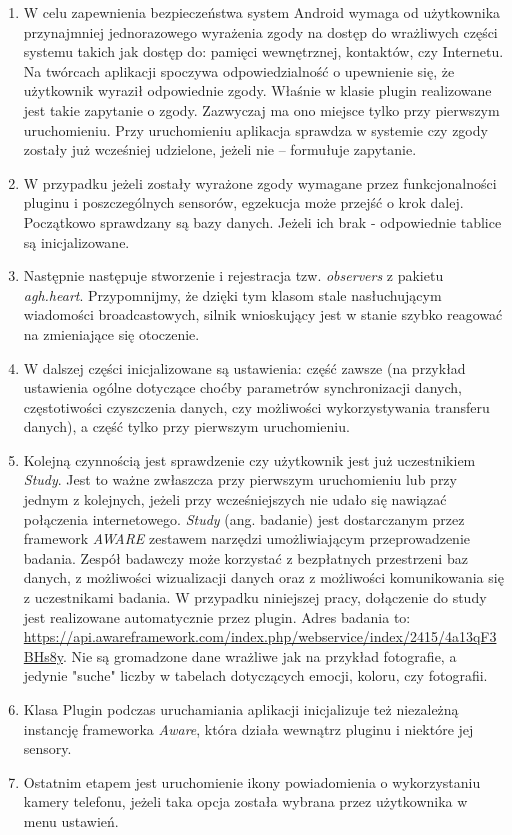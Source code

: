 \begin{enumerate}
	\item W celu zapewnienia bezpieczeństwa system Android wymaga od użytkownika przynajmniej jednorazowego wyrażenia zgody na dostęp do wrażliwych części systemu takich jak dostęp do: pamięci wewnętrznej, kontaktów, czy Internetu. Na twórcach aplikacji spoczywa odpowiedzialność o upewnienie się, że użytkownik wyraził odpowiednie zgody. Właśnie w klasie plugin realizowane jest takie zapytanie o zgody. Zazwyczaj ma ono miejsce tylko przy pierwszym uruchomieniu. Przy uruchomieniu aplikacja sprawdza w systemie czy zgody zostały już wcześniej udzielone, jeżeli nie -- formułuje zapytanie.
	
	\item W przypadku jeżeli zostały wyrażone zgody wymagane przez funkcjonalności pluginu i poszczególnych sensorów, egzekucja może przejść o krok dalej. Początkowo sprawdzany są bazy danych. Jeżeli ich brak - odpowiednie tablice są inicjalizowane. 
	
	\item Następnie następuje stworzenie i rejestracja tzw. \textit{observers} z pakietu \textit{agh.heart}. Przypomnijmy, że dzięki tym klasom stale nasłuchującym wiadomości broadcastowych, silnik wnioskujący jest w stanie szybko reagować na zmieniające się otoczenie. 
	
	\item W dalszej części inicjalizowane są ustawienia: część zawsze (na przykład ustawienia ogólne dotyczące choćby parametrów synchronizacji danych, częstotiwości czyszczenia danych, czy możliwości wykorzystywania transferu danych), a część tylko przy pierwszym uruchomieniu.
	
	\item Kolejną czynnością jest sprawdzenie czy użytkownik jest już uczestnikiem \textit{Study}. Jest to ważne zwłaszcza przy pierwszym uruchomieniu lub przy jednym z kolejnych, jeżeli przy wcześniejszych nie udało się nawiązać połączenia internetowego. \textit{Study} (ang. badanie) jest dostarczanym przez framework \textit{AWARE} zestawem narzędzi umożliwiającym przeprowadzenie badania. Zespół badawczy może korzystać z bezpłatnych przestrzeni baz danych, z możliwości wizualizacji danych oraz z możliwości komunikowania się z uczestnikami badania. W przypadku niniejszej pracy, dołączenie do study jest realizowane automatycznie przez plugin. Adres badania to: \url{https://api.awareframework.com/index.php/webservice/index/2415/4a13qF3BHs8y}. Nie są gromadzone dane wrażliwe jak na przykład fotografie, a jedynie "suche" liczby w tabelach dotyczących emocji, koloru, czy fotografii.
	
	\item Klasa Plugin podczas uruchamiania aplikacji inicjalizuje też niezależną instancję frameworka \textit{Aware}, która działa wewnątrz pluginu i niektóre jej sensory.
	
	\item Ostatnim etapem jest uruchomienie ikony powiadomienia o wykorzystaniu kamery telefonu, jeżeli taka opcja została wybrana przez użytkownika w menu ustawień.
\end{enumerate}

